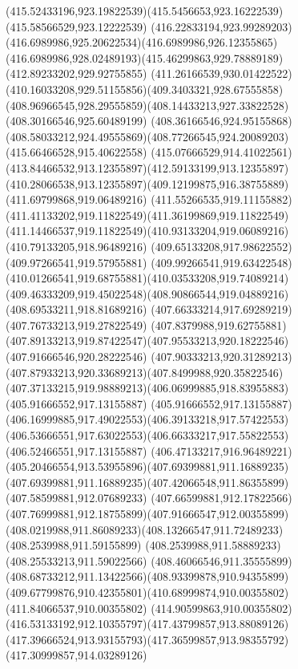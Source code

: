 {{{{				\curveto(415.52433196,923.19822539)(415.5456653,923.16222539)(415.58566529,923.12222539)
				\curveto(416.22833194,923.99289203)(416.6989986,925.20622534)(416.6989986,926.12355865)
				\curveto(416.6989986,928.02489193)(415.46299863,929.78889189)(412.89233202,929.92755855)
				\curveto(411.26166539,930.01422522)(410.16033208,929.51155856)(409.3403321,928.67555858)
				\curveto(408.96966545,928.29555859)(408.14433213,927.33822528)(408.30166546,925.60489199)
				\curveto(408.36166546,924.95155868)(408.58033212,924.49555869)(408.77266545,924.20089203)
				\moveto(415.66466528,915.40622558)
				\curveto(415.07666529,914.41022561)(413.84466532,913.12355897)(412.59133199,913.12355897)
				\curveto(410.28066538,913.12355897)(409.12199875,916.38755889)(411.69799868,919.06489216)
				\curveto(411.55266535,919.11155882)(411.41133202,919.11822549)(411.36199869,919.11822549)
				\curveto(411.14466537,919.11822549)(410.93133204,919.06089216)(410.79133205,918.96489216)
				\lineto(409.65133208,917.98622552)
				\lineto(409.97266541,919.57955881)
				\curveto(409.99266541,919.63422548)(410.01266541,919.68755881)(410.03533208,919.74089214)
				\curveto(409.46333209,919.45022548)(408.90866544,919.04889216)(408.69533211,918.81689216)
				\lineto(407.66333214,917.69289219)
				\lineto(407.76733213,919.27822549)
				\lineto(407.8379988,919.62755881)
				\curveto(407.89133213,919.87422547)(407.95533213,920.18222546)(407.91666546,920.28222546)
				\curveto(407.90333213,920.31289213)(407.87933213,920.33689213)(407.8499988,920.35822546)
				\curveto(407.37133215,919.98889213)(406.06999885,918.83955883)(405.91666552,917.13155887)
				\curveto(405.91666552,917.13155887)(406.16999885,917.49022553)(406.39133218,917.57422553)
				\curveto(406.53666551,917.63022553)(406.66333217,917.55822553)(406.52466551,917.13155887)
				\curveto(406.47133217,916.96489221)(405.20466554,913.53955896)(407.69399881,911.16889235)
				\curveto(407.69399881,911.16889235)(407.42066548,911.86355899)(407.58599881,912.07689233)
				\curveto(407.66599881,912.17822566)(407.76999881,912.18755899)(407.91666547,912.00355899)
				\curveto(408.0219988,911.86089233)(408.13266547,911.72489233)(408.2539988,911.59155899)
				\lineto(408.2539988,911.58889233)
				\lineto(408.25533213,911.59022566)
				\curveto(408.46066546,911.35555899)(408.68733212,911.13422566)(408.93399878,910.94355899)
				\curveto(409.67799876,910.42355801)(410.68999874,910.00355802)(411.84066537,910.00355802)
				\curveto(414.90599863,910.00355802)(416.53133192,912.10355797)(417.43799857,913.88089126)
				\curveto(417.39666524,913.93155793)(417.36599857,913.98355792)(417.30999857,914.03289126)
}}}}
